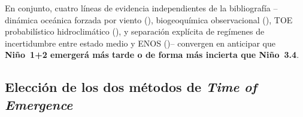 \documentclass[11pt,a4paper]{article}
\begin{document}
En conjunto, cuatro líneas de evidencia independientes de la bibliografía --dinámica oceánica forzada por viento (\citealp{larson2025,poul2025}), biogeoquímica observacional (\citealp{keller2014}), TOE probabilístico hidroclimático (\citealp{chadwick2019}), y separación explícita de regímenes de incertidumbre entre estado medio y ENOS (\citealp{zhong2023})-- convergen en anticipar que \textbf{Ni\~no~1+2 emergerá más tarde o de forma más incierta que Ni\~no~3.4}.

\subsection{Elecci\'on de los dos m\'etodos de \emph{Time of Emergence}}
\label{sec:toe_metodos}
\end{document}
